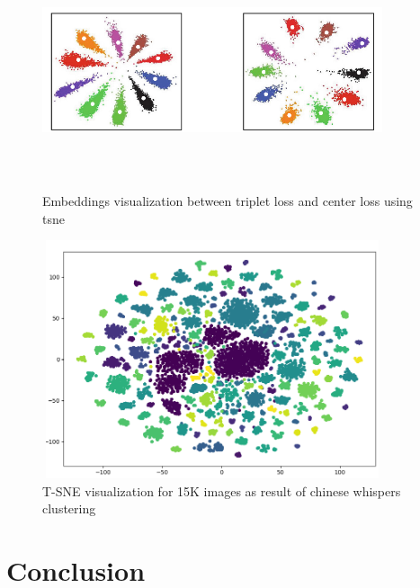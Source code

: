 \documentclass[a4paper,12pt, twoside]{NITKReport}
\begin{document}
\begin{figure} [h]
\centering
    \includegraphics[height=7cm,width=10cm]{embeddings.png}
    \caption{Embeddings visualization between triplet loss and center loss using tsne}
    \label{embedding_vis}
\end{figure}

\begin{figure} [h]
\centering
    \includegraphics[height=7cm,width=10cm]{tsne_15k.png}
    \caption{T-SNE visualization for 15K images as result of chinese whispers clustering}
    \label{tsne}
\end{figure}


\newpage
\chapter{Conclusion}
\label{chap5}
\end{document}
